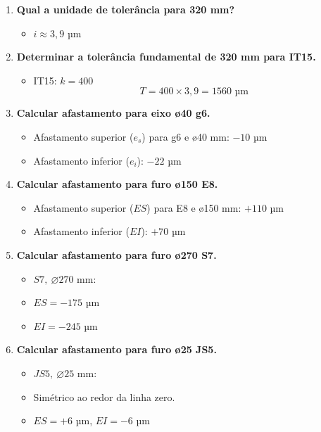 \begin{enumerate}
    \item \textbf{Qual a unidade de tolerância para 320 mm?}
    \begin{itemize}
        \item \( i \approx 3,9 \) µm
    \end{itemize}

    \item \textbf{Determinar a tolerância fundamental de 320 mm para IT15.}
    \begin{itemize}
        \item IT15: \( k = 400 \)
        \[
            T = 400 \times 3,9 = 1560 \text{ µm}
        \]
    \end{itemize}

    \item \textbf{Calcular afastamento para eixo ø40 g6.}
    \begin{itemize}
        \item Afastamento superior (\( e_s \)) para g6 e ø40 mm: \(-10\) µm
        \item Afastamento inferior (\( e_i \)): \(-22\) µm
    \end{itemize}

    \item \textbf{Calcular afastamento para furo ø150 E8.}
    \begin{itemize}
        \item Afastamento superior (\( ES \)) para E8 e ø150 mm: \(+110\) µm
        \item Afastamento inferior (\( EI \)): \(+70\) µm
    \end{itemize}

    \item \textbf{Calcular afastamento para furo ø270 S7.}
    \begin{itemize}

        \item \( S7, \ \varnothing 270 \) mm:
        \item \( ES = -175 \) µm
        \item \( EI = -245 \) µm
    \end{itemize}

    \item \textbf{Calcular afastamento para furo ø25 JS5.}
    \begin{itemize}
        \item \( JS5, \ \varnothing 25 \) mm:
        \item Simétrico ao redor da linha zero.
        \item \( ES = +6 \) µm, \( EI = -6 \) µm
    \end{itemize}


\end{enumerate}
